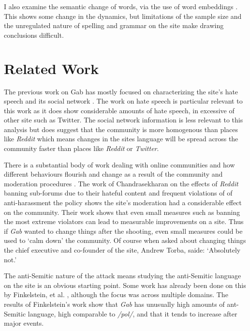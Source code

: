 \documentclass[letterpaper]{article}
\begin{document}
I also examine the semantic change of words, via the use of word embeddings \cite{mikolov2013efficient, hamilton2016diachronic}. This shows some change in the dynamics, but limitations of the sample size and the unregulated nature of spelling and grammar on the site make drawing conclusions difficult.

\section{Related Work}

The previous work on Gab  has mostly focused on characterizing the site's hate speech \cite{lima2018inside} and its social network \cite{zannettou2018gab}. The work on hate speech is particular relevant to this work as it does show considerable amounts of hate speech, in excessive of other site such as Twitter. The social network information is less relevant to this analysis but does suggest that the community is more homogenous than places like \textit{Reddit} which means changes in the sites language will be spread across the community faster than places like \textit{Reddit} or \textit{Twitter}.

There is a substantial body of work dealing with online communities and how different behaviours flourish and change as a result of the community and moderation procedures \cite{phillips2013house, bergstrom2011don}. The work of Chandrasekharan \cite{chandrasekharan2017you} on the effects of \textit{Reddit} banning sub-forums due to their hateful content and frequent violations of of anti-harassment the policy shows the site's moderation had a considerable effect on the community. Their work shows that even small measures such as banning the most extreme violators can lead to measurable improvements on a site. Thus if \textit{Gab} wanted to change things after the shooting, even small measures could be used to `calm down' the community. Of course when asked about changing things the chief executive and co-founder of the site, Andrew Torba, saide: `Absolutely not.' \cite{roose_2018}

The anti-Semitic nature of the attack means studying the anti-Semitic language on the site is an obvious starting point. Some work has already been done on this by Finkelstein, et al. \cite{finkelstein2018quantitative}, although the focus was across multiple domains. The results of Finkelstein's work show that \textit{Gab} has unusually high amounts of ant-Semitic language, high comparable to \textit{/pol/},  and that it tends to increase after major events.
\end{document}
